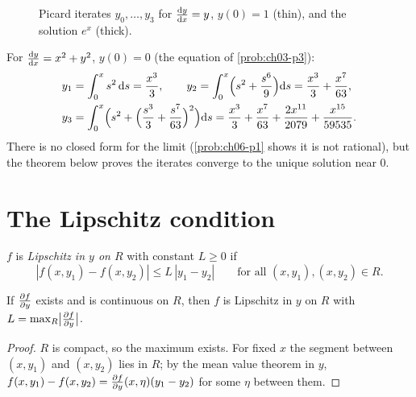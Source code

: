 \begin{figure}[ht]
  \centering
  
  \caption{Picard iterates $y_0,\dots,y_3$ for $\frac{\mathrm{d}y}{\mathrm{d}x} = y$, $y(0) = 1$
  (thin), and the solution $e^x$ (thick).}
  \label{fig:ch08-picard}
\end{figure}

\begin{example}\label{ex:ch08-picard-riccati}
For $\frac{\mathrm{d}y}{\mathrm{d}x} = x^2 + y^2$, $y(0) = 0$ (the equation of \cref{prob:ch03-p3}):
\begin{align*}
  y_1 &= \int_0^x s^2\,\mathrm{d}s = \frac{x^3}{3},\qquad
  y_2 = \int_0^x\Bigl(s^2 + \frac{s^6}{9}\Bigr)\mathrm{d}s = \frac{x^3}{3} + \frac{x^7}{63},\\
  y_3 &= \int_0^x\Bigl(s^2 + \Bigl(\frac{s^3}{3} + \frac{s^7}{63}\Bigr)^2\Bigr)\mathrm{d}s
       = \frac{x^3}{3} + \frac{x^7}{63} + \frac{2x^{11}}{2079} + \frac{x^{15}}{59535}.
\end{align*}
There is no closed form for the limit (\cref{prob:ch06-p1} shows it is not
rational), but the theorem below proves the iterates converge to the unique
solution near $0$.
\end{example}

\section{The Lipschitz condition}\label{sec:ch08-lipschitz}

\begin{definition}[Lipschitz in $y$]\label{def:ch08-lipschitz}
$f$ is \emph{Lipschitz in $y$ on $R$} with constant $L\ge0$ if
\[
  |f(x,y_1) - f(x,y_2)|\le L\,|y_1 - y_2|\qquad\text{for all } (x,y_1),(x,y_2)\in R .
\]
\end{definition}

\begin{lemma}\label{lem:ch08-c1-lipschitz}
If $\frac{\partial f}{\partial y}$ exists and is continuous on $R$, then $f$ is Lipschitz in $y$ on
$R$ with $L = \max_R\bigl|\frac{\partial f}{\partial y}\bigr|$.
\end{lemma}
\begin{proof}
$R$ is compact, so the maximum exists. For fixed $x$ the segment between
$(x,y_1)$ and $(x,y_2)$ lies in $R$; by the mean value theorem in $y$,
$f(x,y_1) - f(x,y_2) = \frac{\partial f}{\partial y}(x,\eta)(y_1 - y_2)$ for some $\eta$ between them.
\end{proof}

